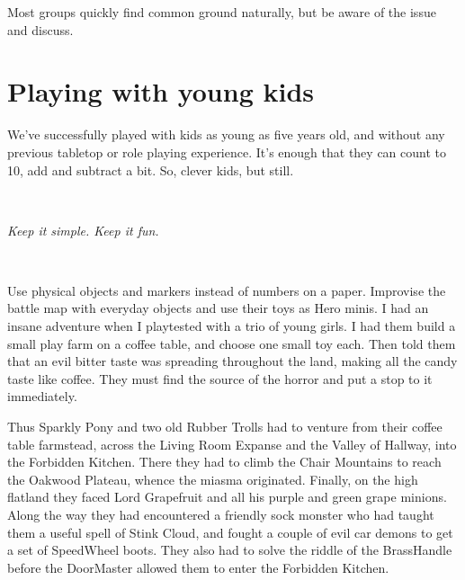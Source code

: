 Most groups quickly find common ground naturally, but be aware of the issue and discuss.










\section*{Playing with young kids}
We've successfully played with kids as young as five years old, and without any previous tabletop or role playing experience. It's enough that they can count to 10, add and subtract a bit. So, clever kids, but still.

\

\noindent \emph{Keep it simple. Keep it fun.}

\

Use physical objects and markers instead of numbers on a paper. Improvise the battle map with everyday objects and use their toys as Hero minis. I had an insane adventure when I playtested with a trio of young girls. I had them build a small play farm on a coffee table, and choose one small toy each. Then told them that an evil bitter taste was spreading throughout the land, making all the candy taste like coffee. They must find the source of the horror and put a stop to it immediately.

Thus Sparkly Pony and two old Rubber Trolls had to venture from their coffee table farmstead, across the Living Room Expanse and the Valley of Hallway, into the Forbidden Kitchen. There they had to climb the Chair Mountains to reach the Oakwood Plateau, whence the miasma originated. Finally, on the high flatland they faced Lord Grapefruit and all his purple and green grape minions. Along the way they had encountered a friendly sock monster who had taught them a useful spell of Stink Cloud, and fought a couple of evil car demons to get a set of SpeedWheel boots. They also had to solve the riddle of the BrassHandle before the DoorMaster allowed them to enter the Forbidden Kitchen.

